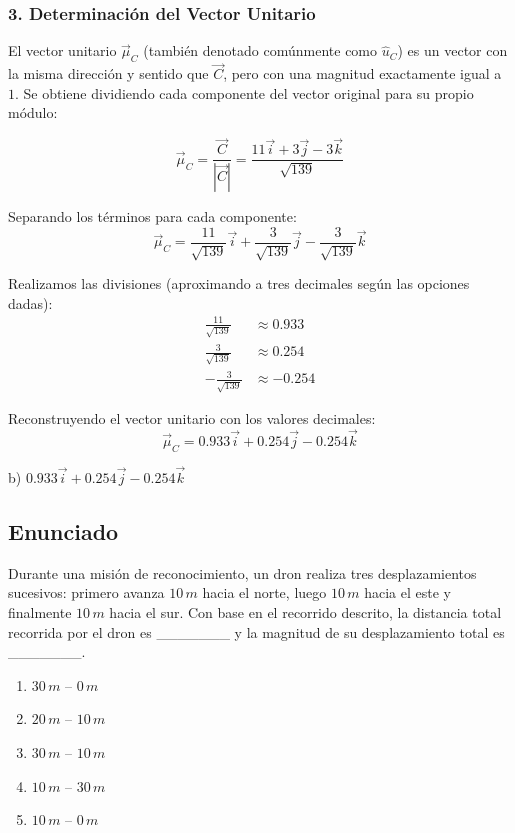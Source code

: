 \documentclass[12pt, a4paper]{article}
\begin{document}
\subsubsection*{3. Determinación del Vector Unitario}
El vector unitario $\vec{\mu}_C$ (también denotado comúnmente como $\hat{u}_C$) es un vector con la misma dirección y sentido que $\vec{C}$, pero con una magnitud exactamente igual a $1$. Se obtiene dividiendo cada componente del vector original para su propio módulo:

$$\vec{\mu}_C = \frac{\vec{C}}{|\vec{C}|} = \frac{11\vec{i} + 3\vec{j} - 3\vec{k}}{\sqrt{139}}$$

Separando los términos para cada componente:
$$\vec{\mu}_C = \frac{11}{\sqrt{139}}\vec{i} + \frac{3}{\sqrt{139}}\vec{j} - \frac{3}{\sqrt{139}}\vec{k}$$

Realizamos las divisiones (aproximando a tres decimales según las opciones dadas):
\begin{align*}
    \frac{11}{\sqrt{139}} &\approx 0.933 \\
    \frac{3}{\sqrt{139}} &\approx 0.254 \\
    -\frac{3}{\sqrt{139}} &\approx -0.254
\end{align*}

Reconstruyendo el vector unitario con los valores decimales:
$$\vec{\mu}_C = 0.933\vec{i} + 0.254\vec{j} - 0.254\vec{k}$$

\begin{tcolorbox}[colback=green!5!white, colframe=green!50!black, title=Respuesta Final]
\centering \Large b) $0.933\vec{i} + 0.254\vec{j} - 0.254\vec{k}$
\end{tcolorbox}

\newpage

\subsection*{Enunciado}
Durante una misión de reconocimiento, un dron realiza tres desplazamientos sucesivos: primero avanza $10 \, \si{m}$ hacia el norte, luego $10 \, \si{m}$ hacia el este y finalmente $10 \, \si{m}$ hacia el sur. Con base en el recorrido descrito, la distancia total recorrida por el dron es \_\_\_\_\_\_\_ y la magnitud de su desplazamiento total es \_\_\_\_\_\_\_.

\begin{enumerate}[label=\alph*)]
    \item $30 \, \si{m}$ -- $0 \, \si{m}$
    \item $20 \, \si{m}$ -- $10 \, \si{m}$
    \item $30 \, \si{m}$ -- $10 \, \si{m}$
    \item $10 \, \si{m}$ -- $30 \, \si{m}$
    \item $10 \, \si{m}$ -- $0 \, \si{m}$
\end{enumerate}
\end{document}
